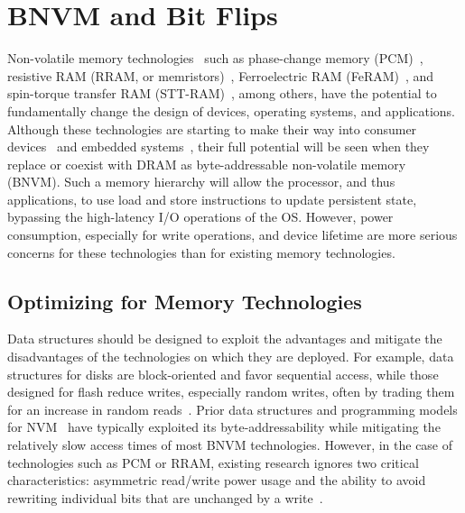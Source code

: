 
\section{BNVM and Bit Flips}
\label{sec:background}


Non-volatile memory technologies~\cite{burr:ibmjrd08} such as phase-change memory
(PCM)~\cite{lee_architecting_2009}, resistive RAM (RRAM, or
memristors)~\cite{strukov:nature08,shen:dtc11}, Ferroelectric RAM
(FeRAM)~\cite{fox:2001feram}, and spin-torque transfer RAM
(STT-RAM)~\cite{sttram}, among others, have the potential to fundamentally
change the design of devices, operating systems, and applications. Although
these technologies are starting to make their way into consumer
devices~\cite{intel3dxpoint} and embedded systems~\cite{shen:dtc11}, their full
potential will be seen when they replace or coexist with DRAM as
byte-addressable non-volatile memory (BNVM). Such a memory hierarchy will allow
the processor, and thus applications, to use load and store instructions to
update persistent state, bypassing the high-latency I/O operations of the
OS. However, power consumption, especially for write operations,
and device lifetime are more serious concerns for these technologies than
for existing memory technologies.

\subsection{Optimizing for Memory Technologies}

Data structures should be designed to exploit the advantages and mitigate the
disadvantages of the technologies on which they are deployed.  For example, data
structures for disks are block-oriented and favor sequential access, while those
designed for flash reduce writes, especially random writes, often by trading them for an increase in
random reads~\cite{colgrove:sigmod15}.  Prior data structures and programming
models for
NVM~\cite{xu:fast16,meza:weed13,greenan:hotdep07,volos:asplos11,coburn:asplos11,condit:sosp09}
have typically exploited its byte-addressability while mitigating the relatively
slow access times of most BNVM technologies.  However, in the case of
technologies such as PCM or RRAM, existing research ignores two critical
characteristics: asymmetric read/write power usage and the ability to avoid
rewriting individual bits that are unchanged by a
write~\cite{burr:ibmjrd08,yang:iscas07}.

